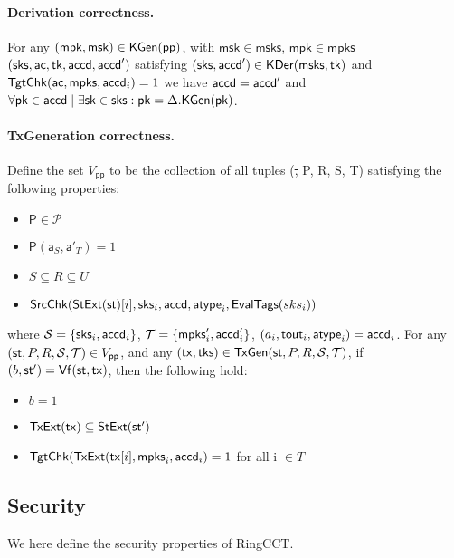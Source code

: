 \paragraph*{Derivation correctness.} For any $(\mathsf{mpk}, \mathsf{msk}) \in \mathsf{KGen}(\mathsf{pp})$, with $\mathsf{msk} \in \mathsf{msks}$, $\mathsf{mpk} \in \mathsf{mpks}$ $(\mathsf{sks}, \mathsf{ac}, \mathsf{tk}, \mathsf{accd}, \mathsf{accd}')$ satisfying $(\mathsf{sks}, \mathsf{accd}') \in \mathsf{KDer}(\mathsf{msks}, \mathsf{tk})$ and $\mathsf{TgtChk}(\mathsf{ac}, \mathsf{mpks}, \mathsf{accd}_{i}) = 1$ we have $\mathsf{accd} = \mathsf{accd}'$ and $\forall\mathsf{pk} \in \mathsf{accd} \mid \exists \mathsf{sk} \in \mathsf{sks} : \mathsf{pk} = \Delta.\mathsf{KGen}(\mathsf{pk})$.


\paragraph*{TxGeneration correctness.} Define the set $V_\mathsf{pp}$ to be the collection of all tuples (\st, P, R, S, T) satisfying the following properties: 
\begin{itemize}
\item $\mathsf{P} \in \mathcal{P}$
\item $\mathsf{P}(\mathsf{a}_S, \mathsf{a}'_T) = 1$
\item $S \subseteq R \subseteq U$
\item $\mathsf{SrcChk}(\mathsf{StExt}(\mathsf{st})[i], \mathsf{sks}_{i}, \mathsf{accd}, \mathsf{atype}_{i}, \mathsf{EvalTags}(sks_i))$
\end{itemize}

where $\mathcal{S} = \{ \mathsf{sks}_i, \mathsf{accd}_i \}$, $\mathcal{T} = \{ \mathsf{mpks}'_i, \mathsf{accd}'_i \}$, $(a_i, \mathsf{tout}_i, \mathsf{atype}_i) = \mathsf{accd}_i$. For any $(\st, P, R, \mathcal{S}, \mathcal{T}) \in V_\mathsf{pp}$, and any $(\tx, \mathsf{tks}) \in \mathsf{TxGen}(\st,  P, R, \mathcal{S}, \mathcal{T})$, if $(b, \mathsf{st'}) = \mathsf{Vf}(\st, \tx)$, then the following hold: \\
\begin{itemize}
\item $b = 1$
\item $\mathsf{TxExt}(\tx) \subseteq \mathsf{StExt}(\st')$
\item $\mathsf{TgtChk}(\mathsf{TxExt}(\mathsf{tx}[i], \mathsf{mpks}_{i}, \mathsf{accd}_{i}) = 1$  for all i $\in T$
\end{itemize}

\subsection{Security}
We here define the security properties of RingCCT.

